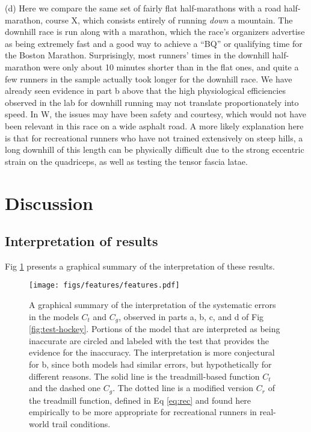\documentclass[10pt,letterpaper]{article}
\begin{document}
(d) Here we compare the same set of fairly flat half-marathons with a road half-marathon, course X,
which consists entirely
of running \emph{down} a mountain. The downhill race is run along with a marathon, which
the race's organizers advertise as being extremely fast and a good way to achieve a ``BQ'' or
qualifying time for the Boston Marathon. Surprisingly, most runners' times in the downhill
half-marathon were only about 10 minutes shorter than in the flat ones, and quite a few runners in
the sample actually took longer for the downhill race. We have already seen evidence in part
b above that the high physiological efficiencies observed in the lab for downhill running may
not translate proportionately into speed. In W, the issues may have been safety and courtesy,
which would not have been relevant in this race on a wide asphalt road. A more likely explanation
here is that for recreational runners who have not trained extensively on steep hills, a long downhill of this
length can be physically difficult due to the strong eccentric strain on the quadriceps, as well as
testing the tensor fascia latae.

\section{Discussion}

\subsection{Interpretation of results}

Fig \ref{fig:features} presents a graphical summary of the interpretation of these results.

\begin{figure}[h]
\texttt{[image: figs/features/features.pdf]}
\centering
\caption{A graphical summary of the interpretation of the systematic errors in the models $C_t$ and $C_g$, observed
in parts a, b, c, and d of Fig \ref{fig:test-hockey}. Portions of the model that are
interpreted as being inaccurate are circled and labeled with the test that provides the
evidence for the inaccuracy. The interpretation is more conjectural for b, since both
models had similar errors, but hypothetically for different reasons.
The solid line is the treadmill-based function $C_t$ and the dashed one $C_g$.
The dotted line is a modified version $C_r$ of the treadmill function, defined in Eq \ref{eq:rec} and found
here empirically to be more appropriate for recreational runners in real-world trail conditions.}
\label{fig:features}
\end{figure}
\end{document}
